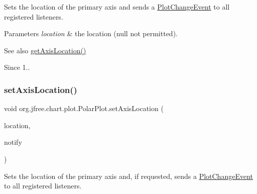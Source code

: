 Sets the location of the primary axis and sends a \mbox{\hyperlink{}{Plot\+Change\+Event}} to all registered listeners.


\begin{DoxyParams}{Parameters}
{\em location} & the location ({\ttfamily null} not permitted).\\
\hline
\end{DoxyParams}
\begin{DoxySeeAlso}{See also}
\mbox{\hyperlink{classorg_1_1jfree_1_1chart_1_1plot_1_1_polar_plot_aa5bf9d06a22374312897b364d41dd339}{get\+Axis\+Location()}}
\end{DoxySeeAlso}
\begin{DoxySince}{Since}
1.. 
\end{DoxySince}
\mbox{\label{classorg_1_1jfree_1_1chart_1_1plot_1_1_polar_plot_aec28b339e2ae28cd8022f90d941e2354}} 
\subsubsection{\texorpdfstring{set\+Axis\+Location()}{setAxisLocation()}\hspace{0.1cm}{\footnotesize\ttfamily [2/4]}}
{\footnotesize\ttfamily void org.\+jfree.\+chart.\+plot.\+Polar\+Plot.\+set\+Axis\+Location (\begin{DoxyParamCaption}\item[{\mbox{\hyperlink{classorg_1_1jfree_1_1chart_1_1plot_1_1_polar_axis_location}{Polar\+Axis\+Location}}}]{location,  }\item[{boolean}]{notify }\end{DoxyParamCaption})}

Sets the location of the primary axis and, if requested, sends a \mbox{\hyperlink{}{Plot\+Change\+Event}} to all registered listeners.


